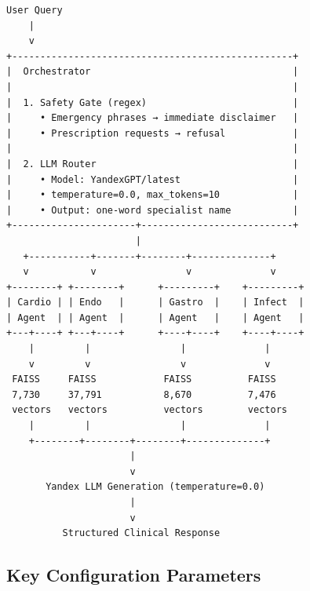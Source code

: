 \documentclass[
  american,
  a4paper,
]{article}
\begin{document}
\begin{verbatim}
User Query
    |
    v
+--------------------------------------------------+
|  Orchestrator                                    |
|                                                  |
|  1. Safety Gate (regex)                          |
|     • Emergency phrases → immediate disclaimer   |
|     • Prescription requests → refusal            |
|                                                  |
|  2. LLM Router                                   |
|     • Model: YandexGPT/latest                    |
|     • temperature=0.0, max_tokens=10             |
|     • Output: one-word specialist name           |
+----------------------+---------------------------+
                       |
   +-----------+-------+--------+--------------+
   v           v                v              v
+--------+ +--------+      +---------+    +---------+
| Cardio | | Endo   |      | Gastro  |    | Infect  |
| Agent  | | Agent  |      | Agent   |    | Agent   |
+---+----+ +---+----+      +----+----+    +----+----+
    |         |                |              |
    v         v                v              v
 FAISS     FAISS            FAISS          FAISS
 7,730     37,791           8,670          7,476
 vectors   vectors          vectors        vectors
    |         |                |              |
    +--------+--------+--------+--------------+
                      |
                      v
       Yandex LLM Generation (temperature=0.0)
                      |
                      v
          Structured Clinical Response
\end{verbatim}

\subsection{Key Configuration
Parameters}\label{key-configuration-parameters}
\end{document}
